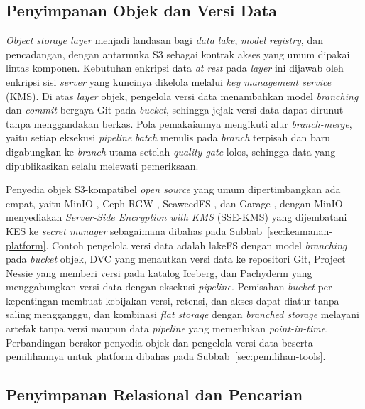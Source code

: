 \subsection{Penyimpanan Objek dan Versi Data}
\label{subsec:storage-layer}

\textit{Object storage layer} menjadi landasan bagi \textit{data lake}, \textit{model registry}, dan pencadangan, dengan antarmuka S3 sebagai kontrak akses yang umum dipakai lintas komponen. Kebutuhan enkripsi data \textit{at rest} pada \textit{layer} ini dijawab oleh enkripsi sisi \textit{server} yang kuncinya dikelola melalui \textit{key management service} (KMS). Di atas \textit{layer} objek, pengelola versi data menambahkan model \textit{branching} dan \textit{commit} bergaya Git pada \textit{bucket}, sehingga jejak versi data dapat dirunut tanpa menggandakan berkas. Pola pemakaiannya mengikuti alur \textit{branch-merge}, yaitu setiap eksekusi \textit{pipeline} \textit{batch} menulis pada \textit{branch} terpisah dan baru digabungkan ke \textit{branch} utama setelah \textit{quality gate} lolos, sehingga data yang dipublikasikan selalu melewati pemeriksaan.

Penyedia objek S3-kompatibel \textit{open source} yang umum dipertimbangkan ada empat, yaitu MinIO \autocite{minio2024}, Ceph RGW \autocite{ceph2025}, SeaweedFS \autocite{seaweedfs2025}, dan Garage \autocite{garage2025}, dengan MinIO menyediakan \textit{Server-Side Encryption with KMS} (SSE-KMS) yang dijembatani KES ke \textit{secret manager} sebagaimana dibahas pada Subbab~\ref{sec:keamanan-platform}. Contoh pengelola versi data adalah lakeFS \autocite{lakefs2025} dengan model \textit{branching} pada \textit{bucket} objek, DVC \autocite{dvc2025} yang menautkan versi data ke repositori Git, Project Nessie \autocite{nessie2025} yang memberi versi pada katalog Iceberg, dan Pachyderm \autocite{pachyderm2025} yang menggabungkan versi data dengan eksekusi \textit{pipeline}. Pemisahan \textit{bucket} per kepentingan membuat kebijakan versi, retensi, dan akses dapat diatur tanpa saling mengganggu, dan kombinasi \textit{flat storage} dengan \textit{branched storage} melayani artefak tanpa versi maupun data \textit{pipeline} yang memerlukan \textit{point-in-time}. Perbandingan berskor penyedia objek dan pengelola versi data beserta pemilihannya untuk platform dibahas pada Subbab~\ref{sec:pemilihan-tools}.

\subsection{Penyimpanan Relasional dan Pencarian}
\label{subsec:relational-search}


